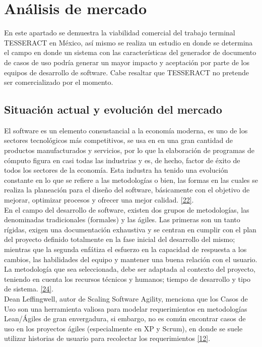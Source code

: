 \chapter{Análisis de mercado} \label{cap:cuatro}

En este apartado se demuestra la viabilidad comercial del trabajo terminal TESSERACT en México, así mismo se realiza un estudio en donde se determina el campo en donde un sistema con las características del generador de documento de casos de uso podría generar un mayor impacto y aceptación por parte de los equipos de desarrollo de software. Cabe resaltar que TESSERACT no pretende ser comercializado por el momento.

\section{Situación actual  y evolución del mercado}

El software es un elemento consustancial a la economía moderna, es uno de los sectores tecnológicos más competitivos, se usa en en una gran cantidad de productos manufacturados y servicios, por lo que  la elaboración de programas de cómputo figura en casi todas las industrias y es, de hecho, factor de éxito de todos los sectores de la economía. Esta industra ha tenido una evolución constante en lo que se refiere a las metodologías o bien, las formas en las cuales se realiza la planeación para el diseño del software, básicamente con el objetivo de mejorar, optimizar procesos y ofrecer una mejor calidad. \hyperlink{b22}{[22]}.\\

En el campo del desarrollo de software, existen dos grupos de metodologías, las denominadas tradicionales (formales) y las ágiles. Las primeras son un tanto rígidas, exigen una documentación exhaustiva y se centran en cumplir con el plan del proyecto definido totalmente en la fase inicial del desarrollo del mismo; mientras que la segunda enfátiza el esfuerzo en la capacidad de respuesta a los cambios, las habilidades del equipo y mantener una buena relación con el usuario. La metodología que sea seleccionada, debe ser adaptada al contexto del proyecto, teniendo en cuenta los recursos técnicos y humanos; tiempo de desarrollo y tipo de sistema. \hyperlink{b24}{[24]}.\\

Dean Leffingwell, autor de Scaling Software Agility, menciona que los Casos de Uso son una herramienta valiosa para modelar requerimientos en metodologías Lean/Ágiles de gran envergadura, si embargo, no es común encontrar casos de uso en los proyectos ágiles (especialmente en XP y Scrum), en donde se suele utilizar historias de usuario para recolectar los requerimientos \hyperlink{b12}{[12]}.\\


